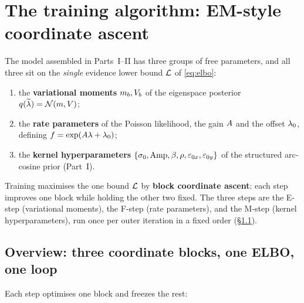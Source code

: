 
\section{The training algorithm: EM-style coordinate ascent}\label{sec:training}

The model assembled in Parts~I--II has three groups of free parameters, and all
three sit on the \emph{single} evidence lower bound $\mathcal{L}$ of
\eqref{eq:elbo}:

\begin{enumerate}[label=(\alph*),leftmargin=2.2em,itemsep=1pt]
  \item the \textbf{variational moments} $m_{b},V_{b}$ of the eigenspace posterior
        $q(\widetilde{\lambda})=\mathcal{N}(m,V)$;
  \item the \textbf{rate parameters} of the Poisson likelihood, the gain
        $A$ and the offset $\lambda_{0}$, defining
        $f=\exp(A\lambda+\lambda_{0})$;
  \item the \textbf{kernel hyperparameters}
        $\{\sigma_{0},\mathrm{Amp},\beta,\rho,\varepsilon_{0x},\varepsilon_{0y}\}$ of the
        structured arc-cosine prior (Part~I).
\end{enumerate}

Training maximises the one bound $\mathcal{L}$ by \textbf{block coordinate ascent}:
each step improves one block while holding the other two fixed. The three steps
are the E-step (variational moments), the F-step (rate parameters), and the
M-step (kernel hyperparameters), run once per outer iteration in a fixed order
(\S\ref{subsec:training-overview}).

\subsection{Overview: three coordinate blocks, one ELBO, one loop}
\label{subsec:training-overview}

Each step optimises one block and freezes the rest:

